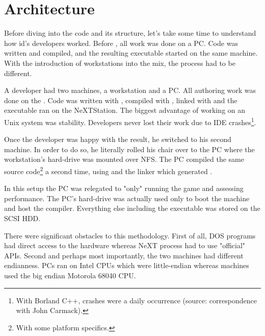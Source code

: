 \section{Architecture}
Before diving into the code and its structure, let's take some time to understand how id's developers worked. Before \doom, all work was done on a PC. Code was written and compiled, and the resulting executable started on the same machine. With the introduction of \NeXT workstations into the mix, the process had to be different.\\
\par
A developer had two machines, a \NeXT workstation and a PC. All authoring work was done on the \NeXT. Code was written with , compiled with , linked with  and the executable ran on the NeXTStation. The biggest advantage of working on an Unix system was stability. Developers never lost their work due to IDE crashes\footnote{With Borland C++, crashes were a daily occurrence (source: correspondence with John Carmack).}.\\
\par
Once the developer was happy with the result, he switched to his second machine. In order to do so, he literally rolled his chair over to the PC where the \NeXT workstation's hard-drive was mounted over NFS. The PC compiled the same source code\footnote{With some platform specifics.} a second time, using  and the  linker which generated . \\
\par
 In this setup the PC was relegated to "only" running the game and assessing performance. The PC's hard-drive was actually used only to boot the machine and host the  compiler. Everything else including the  executable was stored on the \NeXT SCSI HDD.\\
\par
There were significant obstacles to this methodology. First of all, DOS programs had direct access to the hardware whereas NeXT process had to use "official" APIs. Second and perhaps most importantly, the two machines had different endianness. PCs ran on Intel CPUs which were little-endian whereas \NeXT machines used the big endian Motorola 68040 CPU.\\
\vspace{2mm}
\par
\begin{figure}[H]
\centering
{}
\end{figure}
\par



